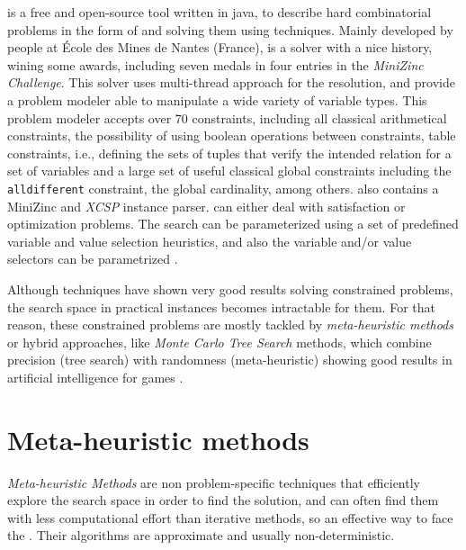 \choco{} is a free and open-source tool written in java, to describe hard combinatorial problems in the form of \csps{} and solving them using \CP{} techniques. Mainly developed by people at \'Ecole des Mines de Nantes (France), is a solver with a nice history, wining some awards, including seven medals in four entries in the \textit{MiniZinc Challenge}. This solver uses multi-thread approach for the resolution, and provide a problem modeler able to manipulate a wide variety of variable types. This problem modeler accepts over 70 constraints, including all classical arithmetical constraints, the possibility of using boolean operations between constraints, table constraints, i.e., defining the sets of tuples that verify the intended relation for a set of variables and a large set of useful classical global constraints including the \texttt{alldifferent} constraint, the global cardinality, among others. \choco{} also contains a {\sc MiniZinc} and \textit{XCSP} instance parser. 
\choco{} can either deal with satisfaction or optimization problems. The search can be parameterized using a set of predefined variable and value selection heuristics, and also the variable and/or value selectors can be parametrized \cite{Jussien2008, Prudhomme2016}.

Although \cp{} techniques have shown very good results solving constrained problems, the search space in practical instances becomes intractable for them. For that reason, these constrained problems are mostly tackled by {\it meta-heuristic methods} or hybrid approaches, like \textit{Monte Carlo Tree Search} methods, which combine precision (tree search) with randomness (meta-heuristic) showing good results in artificial intelligence for games \cite{Chaslot2008, Browne2012}.

\section{Meta-heuristic methods}
\label{sec:meta}

{\it Meta-heuristic Methods} are non problem-specific techniques that efficiently explore the search space in order to find the solution, and can often find them with less computational effort than iterative methods, so an effective way to face the \csps. Their algorithms are approximate and usually non-deterministic.

